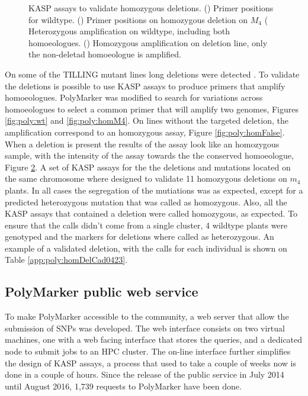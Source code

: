 \begin{figure}
\begin{subfigure}[b]{0.3\textwidth}
        \caption{}
        \label{fig:poly:homReal}
    \end{subfigure}
    \caption{KASP assays to validate homozygous deletions. () Primer positions for wildtype. () Primer positions on  homozygous deletion on $M_{4}$ ( Heterozygous amplification on wildtype, including both homoeologues. () Homozygous amplification on deletion line, only the non-deletad homoeologue is amplified. }
\end{figure}

On some of the TILLING mutant lines long deletions were detected \citep{Krasileva2016}.
To validate the deletions is possible to use KASP assays to produce primers that amplify homoeologues.  
PolyMarker was modified to search for variations across homoeologues to select a common primer that will amplify two genomes, Figures \ref{fig:poly:wt} and \ref{fig:poly:homM4}. 
On lines without the targeted deletion, the amplification correspond to an homozygous assay, Figure \ref{fig:poly:homFalse}.  
When a deletion is present the results of the assay look like an homozygous sample, with the intensity of the assay towards the the conserved homoeologue, Figure \ref{fig:poly:homReal}.
A set of KASP assays for the the deletions and mutations located on the same chromosome where designed to validate 11 homozygous deletions on $m_{4}$ plants. 
In all cases the segregation of the mutiations was as expected, except for a predicted heterozygous mutation that was called as homozygous. 
Also, all the KASP assays that contained a deletion were called homozygous, as expected. 
To ensure that the calls didn't come from a single cluster, 4 wildtype plants were genotyped and the markers for deletions where called as heterozygous. 
An example of a validated deletion, with the calls for each individual is shown on Table \ref{app:poly:homDelCad0423}.

\subsection{PolyMarker public web service}
To make PolyMarker accessible to the community, a web server that allow the submission of SNPs was developed. 
The web interface consists on two virtual machines, one with a web facing interface that stores the queries, and a dedicated node to submit jobs to an HPC cluster.
The on-line interface further simplifies the design of KASP assays, a process that used to take a couple of weeks now is done in a couple of hours. 
Since the release of the public service in July 2014 until August 2016, 1,739 requests to PolyMarker have been done. 


